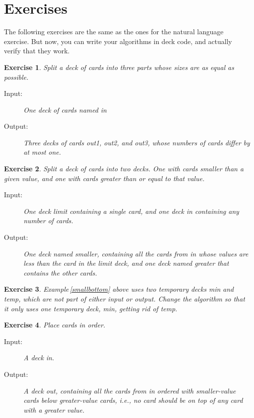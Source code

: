 \documentclass[a4paper,twoside]{tufte-handout}
\newtheorem{exercise}{Exercise}
\begin{document}
\section{Exercises}\label{sec-editrun}

The following exercises are the same as the ones for the natural
language exercise. But now, you can write your algorithms in deck
code, and actually verify that they work.

\begin{exercise}
  Split a deck of cards into three parts whose sizes are as equal as possible.
  \begin{description}
  \item[Input:] One deck of cards named \emph{in}
  \item[Output:] Three decks of cards \emph{out1}, \emph{out2}, and
    \emph{out3}, whose numbers of cards differ by at most one.
 \end{description}
\end{exercise}

\begin{exercise}
  Split a deck of cards into two decks. One with cards smaller than a
  given value, and one with cards greater than or equal to that value.
  \begin{description}
  \item[Input:] One deck \emph{limit} containing a single card, and one
    deck \emph{in} containing any number of cards.
  \item[Output:] One deck named \emph{smaller}, containing all the
    cards from \emph{in} whose values are less than the card in the
    \emph{limit} deck, and one deck named \emph{greater} that contains
    the other cards.
  \end{description}
\end{exercise}

\begin{exercise}
  Example\,\ref{smallbottom} above uses two temporary decks \emph{min}
  and \emph{temp}, which are not part of either input or
  output. Change the algorithm so that it only uses one temporary
  deck, \emph{min}, getting rid of \emph{temp}.
\end{exercise}

\begin{exercise}\label{sort}
  Place cards in order.
  \begin{description}
  \item[Input:] A deck \emph{in}.
  \item[Output:] A deck \emph{out}, containing all the cards from
    \emph{in} ordered with smaller-value cards below greater-value
    cards, i.e., no card should be on top of any card with a greater
    value.
  \end{description}
\end{exercise}
\end{document}
